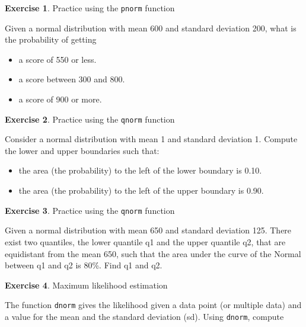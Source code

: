 \documentclass[
  12pt,
]{krantz}
\providecommand{\tightlist}{%
  \setlength{\itemsep}{0pt}\setlength{\parskip}{0pt}}
\theoremstyle{definition}
\theoremstyle{definition}
\theoremstyle{definition}
\newtheorem{exercise}{Exercise}[chapter]
\theoremstyle{definition}
\theoremstyle{remark}
\begin{document}
\begin{exercise}
\protect\hypertarget{exr:Foundationsexercisespnorm3}{}\label{exr:Foundationsexercisespnorm3}Practice using the \texttt{pnorm} function
\end{exercise}

Given a normal distribution with mean 600 and standard deviation 200, what is the probability of getting

\begin{itemize}
\tightlist
\item
  a score of 550 or less.
\item
  a score between 300 and 800.
\item
  a score of 900 or more.
\end{itemize}

\begin{exercise}
\protect\hypertarget{exr:Foundationsexercisesqnorm1}{}\label{exr:Foundationsexercisesqnorm1}Practice using the \texttt{qnorm} function
\end{exercise}

Consider a normal distribution with mean 1 and standard deviation 1.
Compute the lower and upper boundaries such that:

\begin{itemize}
\tightlist
\item
  the area (the probability) to the left of the lower boundary is 0.10.
\item
  the area (the probability) to the left of the upper boundary is 0.90.
\end{itemize}

\begin{exercise}
\protect\hypertarget{exr:Foundationsexercisesqnorm2}{}\label{exr:Foundationsexercisesqnorm2}Practice using the \texttt{qnorm} function
\end{exercise}

Given a normal distribution with mean 650 and standard deviation 125. There exist two quantiles, the lower quantile q1 and the upper quantile q2, that are equidistant from the mean 650, such that the area under the curve of the Normal between q1 and q2 is 80\%. Find q1 and q2.

\begin{exercise}
\protect\hypertarget{exr:Foundationsexercisesmle1}{}\label{exr:Foundationsexercisesmle1}Maximum likelihood estimation
\end{exercise}

The function \texttt{dnorm} gives the likelihood given a data point (or multiple data) and a value for the mean and the standard deviation (sd). Using \texttt{dnorm}, compute
\end{document}
